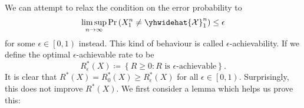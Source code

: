 \documentclass[math]{amznotes}
\theoremstyle{remark}
\begin{document}
We can attempt to relax the condition on the error probability to 
\begin{equation*}
    \limsup_{n \to \infty}\Pr\left(X_1^n \neq \yhwidehat{\mathcal{X}}_1^n\right) \leq \epsilon
\end{equation*}
for some $\epsilon \in \left[0, 1\right)$ instead. This kind of behaviour is called $\epsilon$-achievability. If we define the optimal $\epsilon$-achievable rate to be 
\begin{equation*}
    R_{\epsilon}^*\left(X\right) \coloneqq \left\{R \geq 0 \colon R \textrm{ is } \epsilon\textrm{-achievable}\right\}.
\end{equation*}
It is clear that $R^*\left(X\right) = R^*_0\left(X\right) \geq R^*_{\epsilon}\left(X\right)$ for all $\epsilon \in \left[0, 1\right)$. Surprisingly, this does not improve $R^*\left(X\right)$. We first consider a lemma which helps us prove this:
\end{document}
